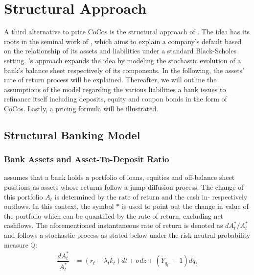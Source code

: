 \section{Structural Approach} \label{sec:structuralapproach}
A third alternative to price CoCos is the structural approach of \citet{pennacchi2010structural}. The idea has its roots in the seminal work of \citet{merton1974pricing}, which aims to explain a company's default based on the relationship of its assets and liabilities under a standard Black-Scholes setting. \citet{pennacchi2010structural}'s approach expands the idea by modeling the stochastic evolution of a bank's balance sheet respectively of its components. In the following, the assets' rate of return process will be explained. Thereafter, we will outline the assumptions of the model regarding the various liabilities a bank issues to refinance itself including deposits, equity and coupon bonds in the form of CoCos. Lastly, a pricing formula will be illustrated.

\subsection{Structural Banking Model}
\subsubsection*{Bank Assets and Asset-To-Deposit Ratio}
\citet{pennacchi2010structural} assumes that a bank holds a portfolio of loans, equities and off-balance sheet positions as assets whose returns follow a jump-diffusion process. The change of this portfolio $A_t$ is determined by the rate of return and the cash in- respectively outflows. In this context, the symbol $*$ is used to point out the change in value of the portfolio which can be quantified by the rate of return, excluding net cashflows. The aforementioned instantaneous rate of return is denoted as $d A_t^*/ A_t^*$ and follows a stochastic process as stated below under the risk-neutral probability measure $\mathbb{Q}$:
\begin{align} \label{bankassetprocess}
\dfrac{d A_t^*}{A_t^*} &= \left( r_t - \lambda_t k_t \right) dt + \sigma dz + \left( Y_{q_{t^{-}}} -1\right) dq_t
\end{align}

